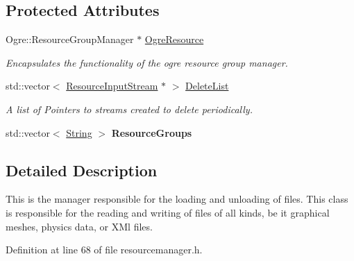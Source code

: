 \subsection*{Protected Attributes}
\begin{DoxyCompactItemize}
\item 
\hypertarget{classphys_1_1ResourceManager_af19bf0549a0896cf84696a39f4ca817d}{
Ogre::ResourceGroupManager $\ast$ \hyperlink{classphys_1_1ResourceManager_af19bf0549a0896cf84696a39f4ca817d}{OgreResource}}
\label{d1/d35/classphys_1_1ResourceManager_af19bf0549a0896cf84696a39f4ca817d}

\begin{DoxyCompactList}\small\item\em Encapsulates the functionality of the ogre resource group manager. \item\end{DoxyCompactList}\item 
\hypertarget{classphys_1_1ResourceManager_a03a283e02f3639f5c1f2de915ed798ae}{
std::vector$<$ \hyperlink{classphys_1_1ResourceInputStream}{ResourceInputStream} $\ast$ $>$ \hyperlink{classphys_1_1ResourceManager_a03a283e02f3639f5c1f2de915ed798ae}{DeleteList}}
\label{d1/d35/classphys_1_1ResourceManager_a03a283e02f3639f5c1f2de915ed798ae}

\begin{DoxyCompactList}\small\item\em A list of Pointers to streams created to delete periodically. \item\end{DoxyCompactList}\item 
\hypertarget{classphys_1_1ResourceManager_a284bc8b042fffbb607355f7874692b54}{
std::vector$<$ \hyperlink{namespacephys_aa03900411993de7fbfec4789bc1d392e}{String} $>$ {\bfseries ResourceGroups}}
\label{d1/d35/classphys_1_1ResourceManager_a284bc8b042fffbb607355f7874692b54}

\end{DoxyCompactItemize}


\subsection{Detailed Description}
This is the manager responsible for the loading and unloading of files. This class is responsible for the reading and writing of files of all kinds, be it graphical meshes, physics data, or XMl files. 

Definition at line 68 of file resourcemanager.h.



